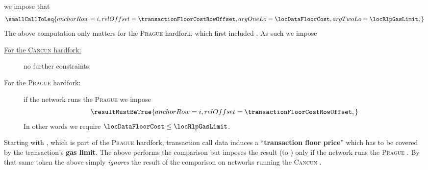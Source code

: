 \item[\underline{\underline{Row n$°(i + \transactionFloorCostRowOffset)$: gas limit must cover the transaction floor cost:}}]
	we impose that
	\[
		\smallCallToLeq {
			anchorRow = i                              ,
			relOffset = \transactionFloorCostRowOffset ,
			argOneLo  = \locDataFloorCost              ,
			argTwoLo  = \locRlpGasLimit                ,
		}
	\]
	The above computation only matters for the \textsc{Prague} hardfork,
	which first included \cite{EIP-7623}.
	As such we impose
	\begin{description}
		\item[\underline{For the \textsc{Cancun} hardfork:}]
			no further constraints;
		\item[\underline{For the \textsc{Prague} hardfork:}]
			if the network runs the \textsc{Prague} \evm{} we impose
			\[
				\resultMustBeTrue {
					anchorRow = i                              ,
					relOffset = \transactionFloorCostRowOffset ,
				}
			\]
			In other words we require $\locDataFloorCost \leq \locRlpGasLimit$.
	\end{description}

	\saNote{}
	Starting with \cite{EIP-7623},
	which is part of the \textsc{Prague} hardfork,
	transaction call data induces a ``\textbf{transaction floor price}''
	which has to be covered by the transaction's \textbf{gas limit}.
	The above performs the comparison but imposes the result (to \true)
	only if the network runs the \textsc{Prague} \evm{}.
	By that same token the above simply \emph{ignores} the result of the
	comparison on networks running the \textsc{Cancun} \evm{}.

